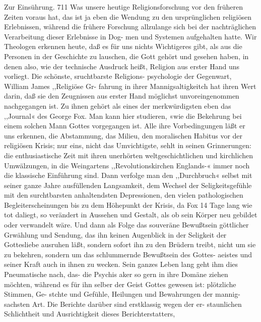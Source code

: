 Zur Einsührung. 711
Was unsere heutige Religionsforschung vor den früheren Zeiten
voraus hat, das ist ja eben die Wendung zu den ursprünglichen
religiösen Erlebnissen, während die frühere Forschung allzulange
sich bei der nachträglichen Verarbeitung dieser Erlebnisse in Dog-
men und Systemen aufgehalten hatte. Wir Theologen erkennen
heute, daß es für uns nichts Wichtigeres gibt, als aus die Personen
in der Geschichte zu lauschen, die Gott gehört und gesehen haben,
in denen also, wie der technische Ausdruck heißt, Religion aus
erster Hand uns vorliegt. Die schönste, sruchtbarste Religions-
psychologie der Gegenwart, William James ,,Religiöse Gr-
fahrung in ihrer Mannigsaltigkeitch hat ihren Wert darin, daß
sie den Zeugnissen aus erster Hand möglichst unvoreingenommen
nachgegangen ist. Zu ihnen gehört als eines der merkwürdigsten
eben das ,,Journal« des George Fox.
Man kann hier studieren, «wie die Bekehrung bei einem
solchen Mann Gottes vorgegangen ist. Alle ihre Vorbedingungen
läßt er uns erkennen, die Abstammung, das Milieu, den moralischen
Habitus vor der religiösen Krisis; nur eins, nicht das Umvichtigste,
sehlt in seinen Grinnerungen: die enthusiastische Zeit mit ihren
unerhörten weltgeschichtlichen und kirchlichen Umwälzungen, in die
Weingartens ,,Revolutionskirchen Englands-« immer noch die
klassische Einführung sind. Dann verfolge man den ,,Durchbruch«
selbst mit seiner ganze Jahre ausfüllenden Langsamkeit, dem
Wechsel der Seligkeitsgefühle mit den surchtbarsten anhaltendsten
Depressionen, den vielen pathologischen Begleiterscheinungen bis
zu dem Höhepunkt der Krisis, da Fox 14 Tage lang wie tot
daliegt, so verändert in Aussehen und Gestalt, als ob sein Körper
neu gebildet oder verwandelt wäre. Und dann als Folge das
souveräne Bewußtsein göttlicher Grwählung und Sendung, das
ihn keinen Augenblick in der Seligkeit der Gottesliebe ausruhen
läßt, sondern sofort ihn zu den Brüdern treibt, nicht um sie zu
bekehren, sondern um das schlummernde Bewußtsein des Gottes-
aeistes und seiner Kraft auch in ihnen zu wecken. Sein ganzes
Leben lang geht ihm dies Pneumatische nach, das- die Psychis
aker so gern in ihre Domäne ziehen möchten, während es für
ihn selber der Geist Gottes gewesen ist: plötzliche Stimmen, Ge-
stchte und Gefühle, Heilungen und Bewahrungen der mannig-
sachsten Art. Die Berichte darüber sind erstklassig wegen der er-
staunlichen Schlichtheit und Ausrichtigkeit dieses Berichterstatters,


